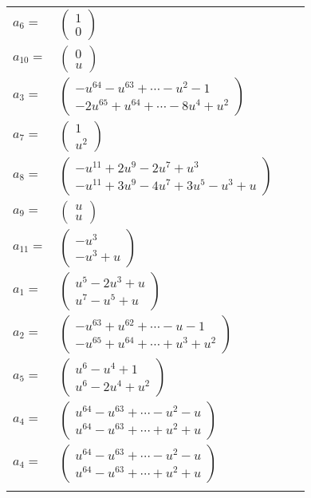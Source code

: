 \documentclass[1p]{elsarticle_modified}
\theoremstyle{definition}
\begin{document}
\begin{tabular}{m{7pt} m{180pt} m{7pt} m{180pt} }
\flushright $a_{6}=$&$\begin{pmatrix}1\\0\end{pmatrix}$ \\
\flushright $a_{10}=$&$\begin{pmatrix}0\\u\end{pmatrix}$ \\
\flushright $a_{3}=$&$\begin{pmatrix}- u^{64}- u^{63}+\cdots- u^2-1\\-2 u^{65}+u^{64}+\cdots-8 u^4+u^2\end{pmatrix}$ \\
\flushright $a_{7}=$&$\begin{pmatrix}1\\u^2\end{pmatrix}$ \\
\flushright $a_{8}=$&$\begin{pmatrix}- u^{11}+2 u^9-2 u^7+u^3\\- u^{11}+3 u^9-4 u^7+3 u^5- u^3+u\end{pmatrix}$ \\
\flushright $a_{9}=$&$\begin{pmatrix}u\\u\end{pmatrix}$ \\
\flushright $a_{11}=$&$\begin{pmatrix}- u^3\\- u^3+u\end{pmatrix}$ \\
\flushright $a_{1}=$&$\begin{pmatrix}u^5-2 u^3+u\\u^7- u^5+u\end{pmatrix}$ \\
\flushright $a_{2}=$&$\begin{pmatrix}- u^{63}+u^{62}+\cdots- u-1\\- u^{65}+u^{64}+\cdots+u^3+u^2\end{pmatrix}$ \\
\flushright $a_{5}=$&$\begin{pmatrix}u^6- u^4+1\\u^6-2 u^4+u^2\end{pmatrix}$ \\
\flushright $a_{4}=$&$\begin{pmatrix}u^{64}- u^{63}+\cdots- u^2- u\\u^{64}- u^{63}+\cdots+u^2+u\end{pmatrix}$\\ \flushright $a_{4}=$&$\begin{pmatrix}u^{64}- u^{63}+\cdots- u^2- u\\u^{64}- u^{63}+\cdots+u^2+u\end{pmatrix}$\\&\end{tabular}
\end{document}
